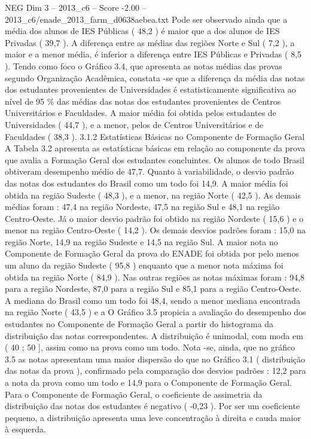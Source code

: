 \begin{textsample}{NEG Dim 3 – 2013\_c6 – Score -2.00 – 2013\_c6/enade\_2013\_farm\_d0638aebea.txt}
Pode ser observado ainda que a média dos alunos de IES Públicas ( 48,2 ) é maior que a dos alunos de IES Privadas ( 39,7 ).
A diferença entre as médias das regiões Norte e Sul ( 7,2 ), a maior e a menor média, é inferior a diferença entre IES Públicas e Privadas ( 8,5 ).
Tendo como foco o Gráfico 3.4, que apresenta as notas médias das provas segundo Organização Acadêmica, constata -se que a diferença da média das notas dos estudantes provenientes de Universidades é estatisticamente significativa ao nível de 95 \% das médias das notas dos estudantes provenientes de Centros Universitários e Faculdades.
A maior média foi obtida pelos estudantes de Universidades ( 44,7 ), e a menor, pelos de Centros Universitários e de Faculdades ( 38,3 ). 3.1.2 Estatísticas Básicas no Componente de Formação Geral A Tabela 3.2 apresenta as estatísticas básicas em relação ao componente da prova que avalia a Formação Geral dos estudantes concluintes.
Os alunos de todo Brasil obtiveram desempenho médio de 47,7.
Quanto à variabilidade, o desvio padrão das notas dos estudantes do Brasil como um todo foi 14,9.
A maior média foi obtida na região Sudeste ( 48,3 ), e a menor, na região Norte ( 42,5 ).
As demais médias foram : 47,4 na região Nordeste, 47,5 na região Sul e 48,1 na região Centro-Oeste.
Já o maior desvio padrão foi obtido na região Nordeste ( 15,6 ) e o menor na região Centro-Oeste ( 14,2 ).
Os demais desvios padrões foram : 15,0 na região Norte, 14,9 na região Sudeste e 14,5 na região Sul.
A maior nota no Componente de Formação Geral da prova do ENADE foi obtida por pelo menos um aluno da região Sudeste ( 95,8 ) enquanto que a menor nota máxima foi obtida na região Norte ( 84,9 ).
Nas outras regiões as notas máximas foram : 94,8 para a região Nordeste, 87,0 para a região Sul e 85,1 para a região Centro-Oeste.
A mediana do Brasil como um todo foi 48,4, sendo a menor mediana encontrada na região Norte ( 43,5 ) e a O Gráfico 3.5 propicia a avaliação do desempenho dos estudantes no Componente de Formação Geral a partir do histograma da distribuição das notas correspondentes.
A distribuição é unimodal, com moda em ( 40 ; 50 ], assim como na prova como um todo.
Nota -se, ainda, que no gráfico 3.5 as notas apresentam uma maior dispersão do que no Gráfico 3.1 ( distribuição das notas da prova ), confirmado pela comparação dos desvios padrões : 12,2 para a nota da prova como um todo e 14,9 para o Componente de Formação Geral.
Para o Componente de Formação Geral, o coeficiente de assimetria da distribuição das notas dos estudantes é negativo ( -0,23 ).
Por ser um coeficiente pequeno, a distribuição apresenta uma leve concentração à direita e cauda maior à esquerda.

\end{textsample}
